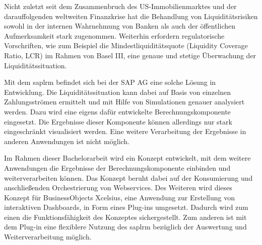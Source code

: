 \seKurzfassung{}
\begin{onehalfspacing}
Nicht zuletzt seit dem Zusammenbruch des US-Immobilienmarktes und der darauffolgenden weltweiten Finanzkrise hat die Behandlung von Liquiditätsrisiken sowohl in der internen Wahrnehmung von Banken als auch der öffentlichen Aufmerksamkeit stark zugenommen. Weiterhin erfordern regulatorische Vorschriften, wie zum Beispiel die Mindestliquiditätsquote (Liquidity Coverage Ratio, LCR) im Rahmen von Basel III, eine genaue und stetige Überwachung der Liquiditätssituation.

Mit dem \gls{saplrm} befindet sich bei der SAP AG eine solche Lösung in Entwicklung. Die Liquiditätssituation kann dabei auf Basis von einzelnen Zahlungsströmen ermittelt und mit Hilfe von Simulationen genauer analysiert werden. Dazu wird eine eigens dafür entwickelte Berechnungskomponente eingesetzt. Die Ergebnisse dieser Komponente können allerdings nur stark eingeschränkt visualisiert werden. Eine weitere Verarbeitung der Ergebnisse in anderen Anwendungen ist nicht möglich.

Im Rahmen dieser Bachelorarbeit wird ein Konzept entwickelt, mit dem weitere Anwendungen die Ergebnisse der Berechnungskomponente einbinden und weiterverarbeiten können. Das Konzept beruht dabei auf der Konsumierung und anschließenden Orchestrierung von Webservices. Des Weiteren wird dieses Konzept für BusinessObjects Xcelsius, eine Anwendung zur Erstellung von interaktiven Dashboards, in Form eines Plug-ins umgesetzt. Dadurch wird zum einen die Funktionsfähigkeit des Konzeptes sichergestellt. Zum anderen ist mit dem Plug-in eine flexiblere Nutzung des \gls{saplrm} bezüglich der Auswertung und Weiterverarbeitung möglich.

\end{onehalfspacing}
\newpage


\seInhaltsverzeichnis[
einrueckung=ja,
gliederungsebenen=4
]



